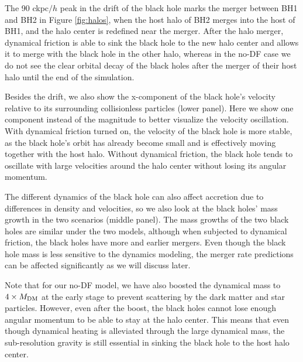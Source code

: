 The 90 ckpc$/h$ peak in the drift of the black hole marks the merger between BH1 and BH2 in Figure \ref{fig:halos}, when the host halo of BH2 merges into the host of BH1, and the halo center is redefined near the merger. After the halo merger, dynamical friction is able to sink the black hole to the new halo center and allows it to merge with the black hole in the other halo, whereas in the no-DF case we do not see the clear orbital decay of the black holes after the merger of their host halo until the end of the simulation.

Besides the drift, we also show the x-component of the black hole's velocity relative to its surrounding collisionless particles (lower panel). Here we show one component instead of the magnitude to better visualize the velocity oscillation. With dynamical friction turned on, the velocity of the black hole is more stable, as the black hole's orbit has already become small and is effectively moving together with the host halo. Without dynamical friction, the black hole tends to oscillate with large velocities around the halo center without losing its angular momentum.

The different dynamics of the black hole can also affect accretion due to differences in density and velocities, so we also look at the black holes' mass growth in the two scenarios (middle panel). The mass growths of the two black holes are similar under the two models, although when subjected to dynamical friction, the black holes have more and earlier mergers. Even though the black hole mass is less sensitive to the dynamics modeling, the merger rate predictions can be affected significantly as we will discuss later. 

Note that for our no-DF model, we have also boosted the dynamical mass to $4\times M_{\rm DM}$ at the early stage to prevent scattering by the dark matter and star particles. However, even after the boost, the black holes cannot lose enough angular momentum to be able to stay at the halo center. This means that even though dynamical heating is alleviated through the large dynamical mass, the sub-resolution gravity is still essential in sinking the black hole to the host halo center.



